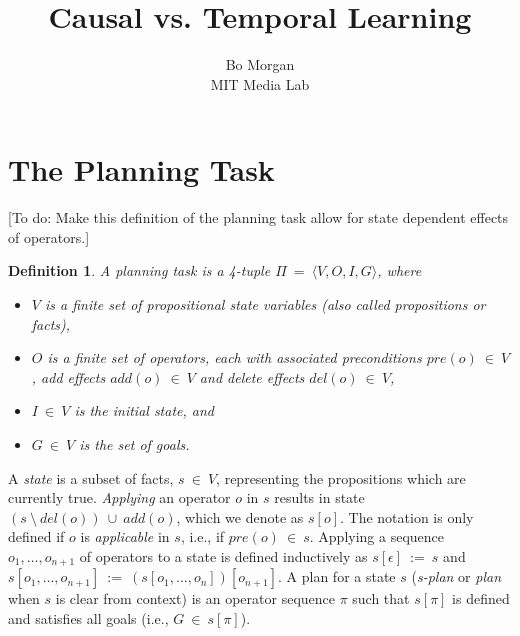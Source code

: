 \documentclass[twoside,letterpaper,11pt]{article}
\newtheorem{mydef}{Definition}
\begin{document}
\setlength{\pdfpageheight}{\paperheight}
\setlength{\pdfpagewidth}{\paperwidth}

\title{Causal vs. Temporal Learning}
\author{Bo Morgan\\
MIT Media Lab}
\renewcommand{\today}{September 26, 2011}
\maketitle




\section{The Planning Task}

[To do: Make this definition of the planning task allow for state dependent effects of operators.]

\begin{mydef}
A planning task is a 4-tuple $\Pi~=~{\langle}V,O,I,G{\rangle}$, where

\begin{itemize}
\item $V$ is a finite set of \emph{propositional state variables} (also called \emph{propositions} or \emph{facts}),
\item $O$ is a finite set of \emph{operators}, each with associated \emph{preconditions} $pre(o)~\in~V$, \emph{add effects} $add(o)~\in~V$ and \emph{delete effects} $del(o)~\in~V$,
\item $I~\in~V$ is the \emph{initial state}, and
\item $G~\in~V$ is the set of \emph{goals}.
\end{itemize}

\end{mydef}

A \emph{state} is a subset of facts, $s~\in~V$, representing the propositions which are currently true.
\emph{Applying} an operator $o$ in $s$ results in state $(s~\setminus~del(o))~\cup~add(o)$, which we denote as $s[o]$.
The notation is only defined if $o$ is \emph{applicable} in $s$, i.e., if $pre(o)~\in~s$.
Applying a sequence $o_1,{\ldots},o_{n+1}$ of operators to a state is defined inductively as $s[\epsilon]~:=~s$ and $s[o_1,{\ldots},o_{n+1}]~:=~(s[o_1,{\ldots},o_n])[o_{n+1}]$.
A plan for a state $s$ (\emph{s-plan} or \emph{plan} when $s$ is clear from context) is an operator sequence $\pi$ such that $s[\pi]$ is defined and satisfies all goals (i.e., $G~\in~s[\pi]$).
\end{document}
